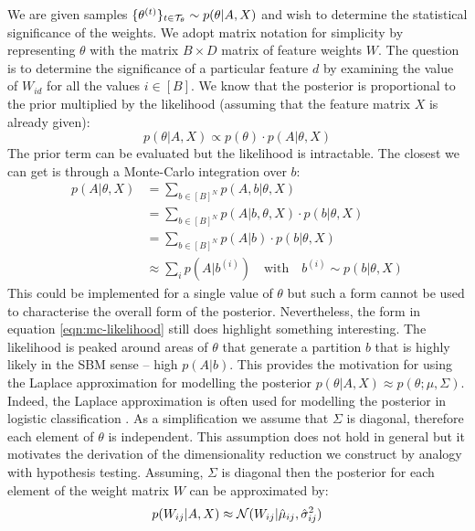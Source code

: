 We are given samples $\{\theta^{(t)}\}_{t \in \mathcal{T}_\theta} \sim p(\theta | A, X)$ and wish to determine the statistical significance of the weights. We adopt matrix notation for simplicity by representing $\theta$ with the matrix $B \times D$ matrix of feature weights $W$. The question is to determine the significance of a particular feature $d$ by examining the value of $W_{id}$ for all the values $i \in [B]$. We know that the posterior is proportional to the prior multiplied by the likelihood (assuming that the feature matrix $X$ is already given):
%
\begin{equation}
	p(\theta|A, X) \propto p(\theta) \cdot p(A | \theta, X)
\end{equation}
%
The prior term can be evaluated but the likelihood is intractable. The closest we can get is through a Monte-Carlo integration over $b$:
%
\begin{align}
	p(A | \theta, X) &= \sum_{b \in [B]^N} p(A, b | \theta, X) \nonumber \\
	&= \sum_{b \in [B]^N} p(A | b, \theta, X) \cdot p(b | \theta, X) \nonumber \\
	&= \sum_{b \in [B]^N} p(A | b) \cdot p(b | \theta, X) \nonumber \\
	&\approx \sum_{i} p\left( A | b^{(i)} \right) \quad \textrm{with} \quad b^{(i)} \sim p(b| \theta, X)
	\label{eqn:mc-likelihood}
\end{align}
%
This could be implemented for a single value of $\theta$ but such a form cannot be used to characterise the overall form of the posterior. Nevertheless, the form in equation \ref{eqn:mc-likelihood} still does highlight something interesting. The likelihood is peaked around areas of $\theta$ that generate a partition $b$ that is highly likely in the SBM sense -- high $p(A|b)$. This provides the motivation for using the Laplace approximation for modelling the posterior $p(\theta | A, X) \approx p(\theta; \mu, \Sigma)$. Indeed, the Laplace approximation is often used for modelling the posterior in logistic classification \cite{laplace}. As a simplification we assume that $\Sigma$ is diagonal, therefore each element of $\theta$ is independent. This assumption does not hold in general but it motivates the derivation of the dimensionality reduction we construct by analogy with hypothesis testing. Assuming, $\Sigma$ is diagonal then the posterior for each element of the weight matrix $W$ can be approximated by:
%
\begin{equation}
	p(W_{ij}|A, X) \approx \mathcal{N}(W_{ij}|\hat{\mu}_{ij}, \hat{\sigma}_{ij}^2)
\end{equation}
